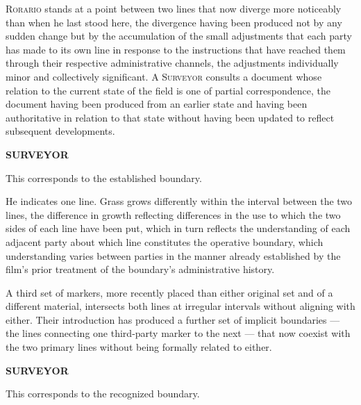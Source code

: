 \documentclass[12pt, oneside]{article}
\newenvironment{action}{%
  \vspace{0.6em}%
  \noindent\ignorespaces%
}{%
  \par\vspace{0.6em}%
}
\newcommand{\character}[1]{%
  \vspace{0.8em}%
  \begin{center}%
    \bfseries\MakeUppercase{#1}%
  \end{center}%
  \vspace{-0.3em}%
}
\newenvironment{dialogue}{%
  \vspace{0.2em}%
  \begin{list}{}{%
    \setlength{\leftmargin}{1.2in}%
    \setlength{\rightmargin}{0.8in}%
    \setlength{\itemsep}{0.6em}%
    \setlength{\parsep}{0pt}%
  }%
}{%
  \end{list}%
  \vspace{0.4em}%
}
\newcommand{\says}[2]{%
  \character{#1}%
  \begin{dialogue}\item #2\end{dialogue}%
}
\begin{document}
\begin{action}
\textsc{Rorario} stands at a point between two lines that now diverge more noticeably than when he last stood here, the divergence having been produced not by any sudden change but by the accumulation of the small adjustments that each party has made to its own line in response to the instructions that have reached them through their respective administrative channels, the adjustments individually minor and collectively significant. A \textsc{Surveyor} consults a document whose relation to the current state of the field is one of partial correspondence, the document having been produced from an earlier state and having been authoritative in relation to that state without having been updated to reflect subsequent developments.
\end{action}

\says{Surveyor}{This corresponds to the established boundary.}

\begin{action}
He indicates one line. Grass grows differently within the interval between the two lines, the difference in growth reflecting differences in the use to which the two sides of each line have been put, which in turn reflects the understanding of each adjacent party about which line constitutes the operative boundary, which understanding varies between parties in the manner already established by the film's prior treatment of the boundary's administrative history.

A third set of markers, more recently placed than either original set and of a different material, intersects both lines at irregular intervals without aligning with either. Their introduction has produced a further set of implicit boundaries --- the lines connecting one third-party marker to the next --- that now coexist with the two primary lines without being formally related to either.
\end{action}

\says{Surveyor}{This corresponds to the recognized boundary.}
\end{document}

